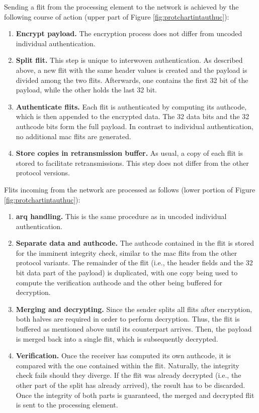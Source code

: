 Sending a flit from the processing element to the network is achieved by the following course of action (upper part of Figure \ref{fig:protchartintauthuc}):
\begin{enumerate}
    \item \textbf{Encrypt payload.} The encryption process does not differ from uncoded individual authentication.
    \item \textbf{Split flit.} This step is unique to interwoven authentication. As described above, a new flit with the same header values is created
        and the payload is divided among the two flits. Afterwards, one contains the first 32 bit of the payload, while the other holds the last 32
        bit.
    \item \textbf{Authenticate flits.} Each flit is authenticated by computing its authcode, which is then appended to the encrypted data. The 32 data
        bits and the 32 authcode bits form the full payload. In contrast to individual authentication, no additional \gls{mac} flits are generated.
    \item \textbf{Store copies in retransmission buffer.} As usual, a copy of each flit is stored to facilitate retransmissions. This step does not
        differ from the other protocol versions.
\end{enumerate}
\vspace{0.5\baselineskip}

Flits incoming from the network are processed as follows (lower portion of Figure \ref{fig:protchartintauthuc}):
\begin{enumerate}
    \item \textbf{\Gls{arq} handling.} This is the same procedure as in uncoded individual authentication.
    \item \textbf{Separate data and authcode.} The authcode contained in the flit is stored for the imminent integrity check, similar to the
        \gls{mac} flits from the other protocol variants. The remainder of the flit (i.e., the header fields and the 32 bit data part of the payload)
        is duplicated, with one copy being used to compute the verification authcode and the other being buffered for decryption.
    \item \textbf{Merging and decrypting.} Since the sender splits all flits after encryption, both halves are required in order to perform
        decryption. Thus, the flit is buffered as mentioned above until its counterpart arrives. Then, the payload is merged back into a single flit,
        which is subsequently decrypted.
    \item \textbf{Verification.} Once the receiver has computed its own authcode, it is compared with the one contained within the flit. Naturally,
        the integrity check fails should they diverge. If the flit was already decrypted (i.e., the other part of the split has already arrived), the
        result has to be discarded. Once the integrity of both parts is guaranteed, the merged and decrypted flit is sent to the processing element.
\end{enumerate}
\vspace{0.5\baselineskip}

